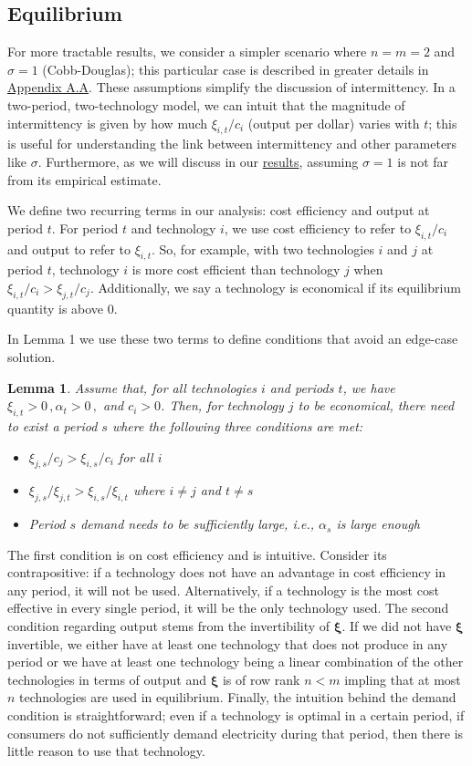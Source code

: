 \documentclass[11pt,a4paper,leqno]{extarticle}
\newtheorem{lemma}{Lemma}
\begin{document}
	\subsection{Equilibrium}
	
	For more tractable results, we consider a simpler scenario where $n = m = 2$ and $\sigma = 1$ (Cobb-Douglas); this particular case is described in greater details in \hyperref[sec:cobbdoug]{Appendix A.A}. These assumptions simplify the discussion of intermittency. In a two-period, two-technology model, we can intuit that the magnitude of intermittency is given by how much $\xi_{i,t}/c_i$ (output per dollar) varies with $t$; this is useful for understanding the link between intermittency and other parameters like $\sigma$. Furthermore, as we will discuss in our \hyperref[sec:results]{results}, assuming $\sigma=1$ is not far from its empirical estimate.
	
	We define two recurring terms in our analysis: cost efficiency and output at period $t$. For period $t$ and technology $i$, we use cost efficiency to refer to $\xi_{i,t}/c_i$ and output to refer to $\xi_{i,t}$. So, for example, with two technologies $i$ and $j$ at period $t$, technology $i$ is more cost efficient than technology $j$ when $\xi_{i,t}/c_i > \xi_{j,t}/c_j$. Additionally, we say a technology is economical if its equilibrium quantity is above 0.
	
	In Lemma 1 we use these two terms to define conditions that avoid an edge-case solution.
	\begin{lemma}
		Assume that, for all technologies $i$ and periods $t$, we have $\xi_{i,t} > 0 \, , \alpha_t > 0 \, ,$ and $ c_i > 0$. Then, for technology $j$ to be economical, there need to exist a period $s$ where the following three conditions are met:
		\begin{itemize}
			\item $\xi_{j,s}/c_j > \xi_{i,s}/c_i$ for all $i$
			\item $\xi_{j,s}/\xi_{j,t} >  \xi_{i,s}/\xi_{i,t} $ where $i \neq j$ and $t \neq s$
			\item Period $s$ demand needs to be sufficiently large, i.e., $\alpha_s$ is large enough
		\end{itemize}
	\end{lemma}
	The first condition is on cost efficiency and is intuitive. Consider its contrapositive: if a technology does not have an advantage in cost efficiency in any period, it will not be used. Alternatively, if a technology is the most cost effective in every single period, it will be the only technology used. The second condition regarding output stems from the invertibility of $\boldsymbol{\xi}$. If we did not have $\boldsymbol{\xi}$ invertible, we either have at least one technology that does not produce in any period or we have at least one technology being a linear combination of the other technologies in terms of output and $\boldsymbol{\xi}$ is of row rank $n < m$ impling that at most $n$ technologies are used in equilibrium. Finally, the intuition behind the demand condition is straightforward; even if a technology is optimal in a certain period, if consumers do not sufficiently demand electricity during that period, then there is little reason to use that technology. 
	
\end{document}
